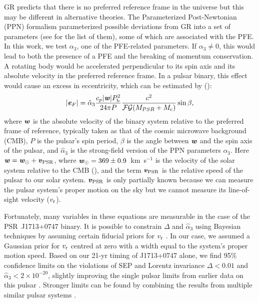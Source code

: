GR predicts that there is no preferred reference frame in the universe but this may
be different in alternative theories. 
The Parameterized Post-Newtonian (PPN) formalism parameterized possible
deviations from GR into a set of parameters (see
\citealt{will14} for the list of them), some of which are associated with the
PFE. In this work, we test $\alpha_3$, one of the PFE-related parameters. 
If $\alpha_3 \neq 0$, this would lead to both
the presence of a PFE and the breaking of momentum conservation.
A rotating body would be accelerated perpendicular to its spin
axis and its absolute velocity in the preferred reference frame.
In a pulsar binary, this effect would cause an excess in eccentricity, which can be estimated by (\citealt{de92, bd96}):
\begin{equation}
|\textbf{\textit{e}}_F| = \hat{\alpha}_3 \frac{c_p|\textbf{\textit{w}}|P_{\rm b}^2}{24\pi P}
\frac{c^2}{\msF\msG (M_{PSR}+M_{\rm c})}\sin \beta,
\end{equation}
where $\textbf{\textit{w}}$ is the absolute velocity of the binary system
relative to the preferred frame of reference, typically taken as that of the cosmic microwave background (CMB), $P$ is the pulsar's spin period, $\beta$ is the
angle between $\textbf{\textit{w}}$ and the spin axis of the pulsar, and
$\hat{\alpha}_3$ is the strong-field version of the PPN parameters $\alpha_3$.
Here $\textbf{\textit{w}} = \textbf{\textit{w}}_{\odot} + \textbf{\textit{v}}_{\rm PSR}$, where
$\textbf{\textit{w}}_{\odot}=369\pm0.9$~km~s$^{-1}$ is the velocity of
the solar system relative to the CMB (\citealt{hwh+09}),
and the term $\textbf{\textit{v}}_{\rm PSR}$ is the relative speed of the pulsar to our solar system. 
$\textbf{\textit{v}}_{\rm PSR}$ is only partially known because we can measure
the pulsar system's proper motion on the sky but we cannot measure its
line-of-sight velocity ($v_{\rm r}$).

Fortunately, many variables in these equations are measurable in the
case of the PSR~J1713+0747 binary. 
It is possible to constrain $\Delta$ and $\hat{\alpha}_3$ using Bayesian techniques 
by assuming certain fiducial priors for $v_{\rm r}$ \citep{sns+05, sfl+05, gsf+11}. 
In our case, we assumed a Gaussian prior for $v_{\rm r}$ centred at zero with
a width equal to the system's proper motion speed.
Based on our 21-yr 
timing of J1713+0747 alone, we find 95\% confidence limits on the violations of SEP and
Lorentz invariance $\Delta < 0.01$ and $\hat{\alpha}_3<2\times10^{-20}$, 
slightly improving the single pulsar limits from earlier data on this pulsar
\citep{sns+05, sfl+05, gsf+11}.
Stronger limits can be found by combining the results from
multiple similar pulsar systems \citep{wex00,sfl+05, gsf+11}.

